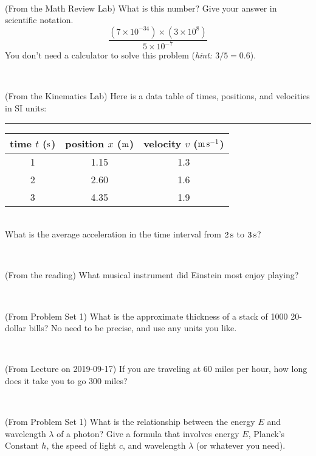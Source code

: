 \documentclass[12pt, letterpaper]{article}
\begin{document}
\vfill ~

\begin{problem} (From the Math Review Lab)
What is this number? Give your answer in scientific notation.
$$
\frac{(7\times10^{-34})\times(3\times10^8)}{5\times10^{-7}}
$$
You don't need a calculator to solve this problem (\textit{hint: $3/5=0.6$}).
\end{problem}


\vfill ~

\begin{problem} (From the Kinematics Lab)
Here is a data table of times, positions, and velocities in SI units:\\
\rule{1.0in}{0pt}\begin{tabular}{c|c|c}
time $t$ ($\mathrm{s}$) & position $x$ ($\mathrm{m}$) & velocity $v$ ($\mathrm{m}\,\mathrm{s}^{-1}$) \\
\hline
1 & 1.15 & 1.3 \\
2 & 2.60 & 1.6 \\
3 & 4.35 & 1.9 \\
\hline
\end{tabular}\\
What is the average acceleration in the time interval from $2\,\mathrm{s}$ to $3\,\mathrm{s}$?
\end{problem}


\vfill ~

\begin{problem} (From the reading)
What musical instrument did Einstein most enjoy playing?
\end{problem}


\vfill ~


\clearpage


\begin{problem} (From Problem Set 1)
What is the approximate thickness of a stack of 1000 20-dollar bills?
No need to be precise, and use any units you like.
\end{problem}


\vfill ~

\begin{problem} (From Lecture on 2019-09-17)
If you are traveling at 60 miles per hour, how long does
it take you to go 300 miles?
\end{problem}


\vfill ~

\begin{problem} (From Problem Set 1)
What is the relationship between the energy $E$ and wavelength
$\lambda$ of a photon? Give a formula that involves energy $E$,
Planck's Constant $h$, the speed of light $c$, and wavelength
$\lambda$ (or whatever you need).
\end{problem}
\end{document}
